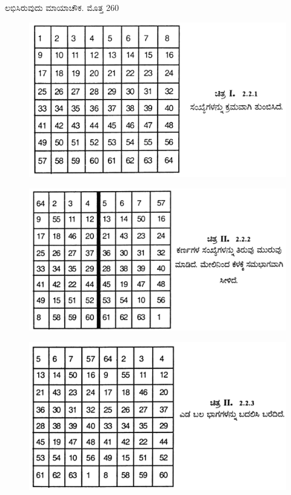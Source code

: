 \begin{itemize}
	ಲಭಿಸಿರುವುದು ಮಾಯಾಚೌಕ. ಮೊತ್ತ 260
	\begin{figure}[H]
	\includegraphics[scale=.8]{src/figures/chap3/fig3.20.jpg}
	\end{figure}
	\begin{figure}[H]
	\includegraphics[scale=.8]{src/figures/chap3/fig3.21.jpg}
	\end{figure}
	\begin{figure}[H]
	\includegraphics[scale=.8]{src/figures/chap3/fig3.22.jpg}

\end{figure}
\end{itemize}
